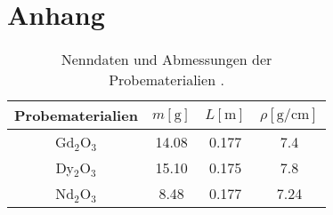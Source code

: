 \section{Anhang}


\begin{table}
    \caption{Nenndaten und Abmessungen der Probematerialien \cite{skript}.}
    \centering
    \label{tab:proben}
    \begin{tabular}{c || c c c}
        \toprule
        \tiny Probematerialien & $m [\si{\gram}]$ & $L [\si{\meter}]$ & $\rho [\si{\gram\per\centi\meter}] $\\
        \midrule
        Gd$_2$O$_3$ & 14.08 & 0.177 & 7.4 \\
        \midrule
        Dy$_2$O$_3$ & 15.10 & 0.175 & 7.8 \\
        \midrule
        Nd$_2$O$_3$ & 8.48  & 0.177 & 7.24 \\
        \bottomrule    
    \end{tabular}
\end{table}

